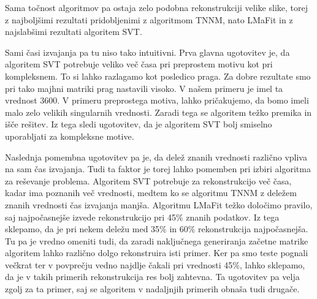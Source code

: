 Sama točnost algoritmov pa ostaja zelo podobna rekonstrukciji velike slike, torej z najboljšimi rezultati pridobljenimi z algoritmom TNNM, nato LMaFit in z najslabšimi rezultati algoritem SVT.


Sami časi izvajanja pa tu niso tako intuitivni. Prva glavna ugotovitev je, da algoritem SVT potrebuje veliko več časa pri preprostem motivu kot pri kompleksnem.  To si lahko razlagamo kot posledico praga. Za dobre rezultate smo pri tako majhni matriki prag nastavili visoko. V našem primeru je imel ta vrednost $3600$. V primeru preprostega motiva, lahko pričakujemo, da bomo imeli malo zelo velikih singularnih vrednosti. Zaradi tega se algoritem težko premika in išče rešitev. Iz tega sledi ugotovitev, da je algoritem SVT bolj smiselno uporabljati za kompleksne motive.

Naslednja pomembna ugotovitev pa je, da delež znanih vrednosti različno vpliva na sam čas izvajanja. Tudi ta faktor je torej lahko pomemben pri izbiri algoritma za reševanje problema. Algoritem SVT potrebuje za rekonstrukcijo več časa, kadar ima poznanih več vrednosti, medtem ko se algoritmu TNNM z deležem znanih vrednosti čas izvajanja manjša. Algoritmu LMaFit težko določimo pravilo, saj najpočasnejše izvede rekonstrukcijo pri 45\% znanih podatkov. Iz tega sklepamo, da je pri nekem deležu med 35\%  in 60\%  rekonstrukcija najpočasnejša. Tu pa je vredno omeniti tudi, da zaradi naključnega generiranja začetne matrike algoritem lahko različno dolgo rekonstruira isti primer.  Ker pa smo teste pognali večkrat ter v povprečju vedno najdlje čakali pri vrednosti 45\%, lahko sklepamo, da je v takih primerih rekonstrukcija res bolj zahtevna. Ta ugotovitev pa velja zgolj za ta primer, saj se algoritem v nadaljnjih primerih obnaša tudi drugače.

